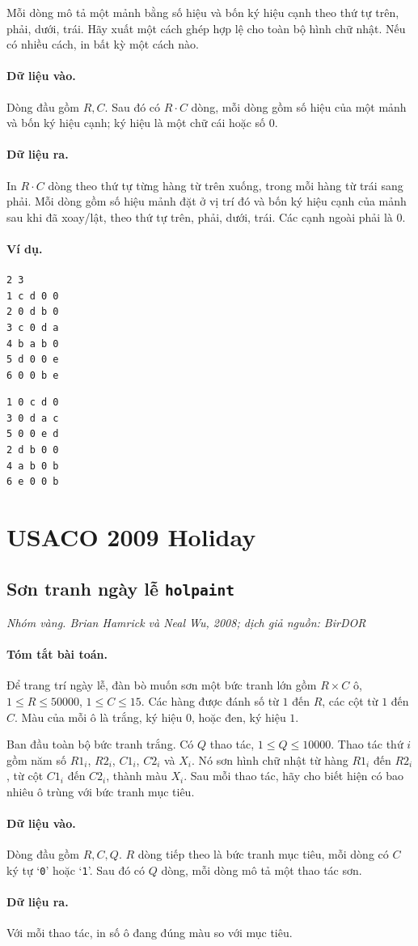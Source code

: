 \documentclass[11pt]{article}
\newcommand{\problem}[4]{%
  \subsection[#1 (#2)]{#1 \hfill {\normalsize\texttt{#2}}}%
  \noindent\textit{#3. #4}\par\smallskip
}
\newcommand{\iosec}[1]{\paragraph{#1}}
\begin{document}
Mỗi dòng mô tả một mảnh bằng số hiệu và bốn ký hiệu cạnh theo thứ tự trên,
phải, dưới, trái. Hãy xuất một cách ghép hợp lệ cho toàn bộ hình chữ nhật.
Nếu có nhiều cách, in bất kỳ một cách nào.

\iosec{Dữ liệu vào.}
Dòng đầu gồm \(R,C\). Sau đó có \(R\cdot C\) dòng, mỗi dòng gồm số hiệu của
một mảnh và bốn ký hiệu cạnh; ký hiệu là một chữ cái hoặc số \(0\).

\iosec{Dữ liệu ra.}
In \(R\cdot C\) dòng theo thứ tự từng hàng từ trên xuống, trong mỗi hàng từ
trái sang phải. Mỗi dòng gồm số hiệu mảnh đặt ở vị trí đó và bốn ký hiệu cạnh
của mảnh sau khi đã xoay/lật, theo thứ tự trên, phải, dưới, trái. Các cạnh
ngoài phải là \(0\).

\iosec{Ví dụ.}
\begin{verbatim}
2 3
1 c d 0 0
2 0 d b 0
3 c 0 d a
4 b a b 0
5 d 0 0 e
6 0 0 b e
\end{verbatim}

\begin{verbatim}
1 0 c d 0
3 0 d a c
5 0 0 e d
2 d b 0 0
4 a b 0 b
6 e 0 0 b
\end{verbatim}

\section{USACO 2009 Holiday}

\problem{Sơn tranh ngày lễ}{holpaint}{Nhóm vàng}{Brian Hamrick và Neal Wu, 2008; dịch giả nguồn: BirDOR}

\iosec{Tóm tắt bài toán.}
Để trang trí ngày lễ, đàn bò muốn sơn một bức tranh lớn gồm \(R\times C\) ô,
\(1\le R\le 50000\), \(1\le C\le 15\). Các hàng được đánh số từ \(1\) đến
\(R\), các cột từ \(1\) đến \(C\). Màu của mỗi ô là trắng, ký hiệu \(0\),
hoặc đen, ký hiệu \(1\).

Ban đầu toàn bộ bức tranh trắng. Có \(Q\) thao tác, \(1\le Q\le 10000\).
Thao tác thứ \(i\) gồm năm số \(R1_i\), \(R2_i\), \(C1_i\), \(C2_i\) và
\(X_i\). Nó sơn hình chữ nhật từ hàng \(R1_i\) đến \(R2_i\), từ cột \(C1_i\)
đến \(C2_i\), thành màu \(X_i\). Sau mỗi thao tác, hãy cho biết hiện có bao
nhiêu ô trùng với bức tranh mục tiêu.

\iosec{Dữ liệu vào.}
Dòng đầu gồm \(R,C,Q\). \(R\) dòng tiếp theo là bức tranh mục tiêu, mỗi dòng
có \(C\) ký tự `\texttt{0}' hoặc `\texttt{1}'. Sau đó có \(Q\) dòng, mỗi
dòng mô tả một thao tác sơn.

\iosec{Dữ liệu ra.}
Với mỗi thao tác, in số ô đang đúng màu so với mục tiêu.
\end{document}
